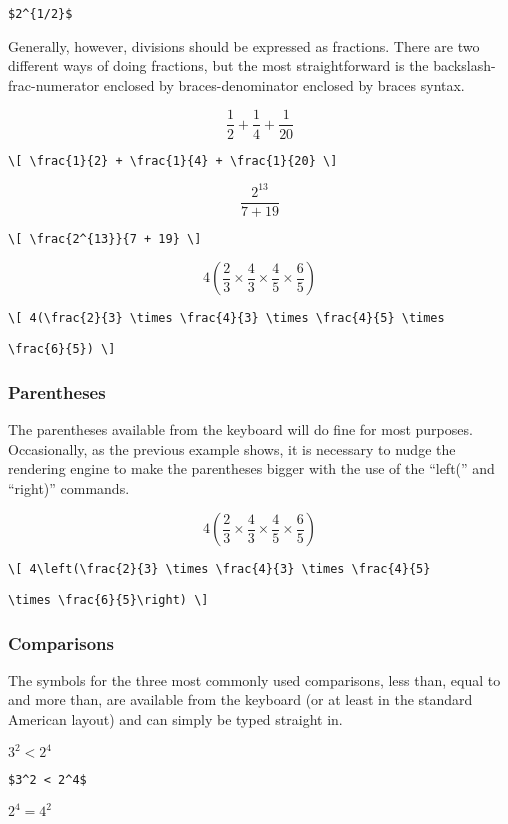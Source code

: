 \verb=$2^{1/2}$=

\bigskip

Generally, however, divisions should be expressed as fractions. There are two different ways of doing fractions, but the most straightforward is the backslash-frac-numerator enclosed by braces-denominator enclosed by braces syntax.

\[ \frac{1}{2} + \frac{1}{4} + \frac{1}{20} \]

\verb=\[ \frac{1}{2} + \frac{1}{4} + \frac{1}{20} \]=

\[ \frac{2^{13}}{7 + 19} \]

\verb=\[ \frac{2^{13}}{7 + 19} \]=

\[ 4(\frac{2}{3} \times \frac{4}{3} \times \frac{4}{5} \times \frac{6}{5}) \]

\verb=\[ 4(\frac{2}{3} \times \frac{4}{3} \times \frac{4}{5} \times=

\verb=\frac{6}{5}) \]=

\subsubsection{Parentheses}

The parentheses available from the keyboard will do fine for most purposes. Occasionally, as the previous example shows, it is necessary to nudge the rendering engine to make the parentheses bigger with the use of the ``left('' and ``right)'' commands.

\[ 4\left(\frac{2}{3} \times \frac{4}{3} \times \frac{4}{5} \times \frac{6}{5}\right) \]

\verb=\[ 4\left(\frac{2}{3} \times \frac{4}{3} \times \frac{4}{5}=

\verb=\times \frac{6}{5}\right) \]=

\subsubsection{Comparisons}

The symbols for the three most commonly used comparisons, less than, equal to and more than, are available from the keyboard (or at least in the standard American layout) and can simply be typed straight in.

\medskip

$3^2 < 2^4$

\smallskip

\verb'$3^2 < 2^4$'

\medskip

$2^4 = 4^2$

